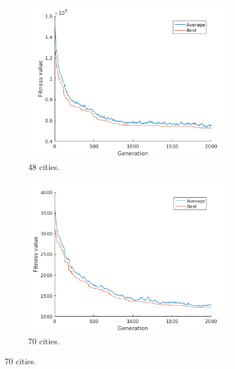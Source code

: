 \documentclass[]{article}
\begin{document}
\begin{figure}[H]
  \begin{subfigure}{0.5\textwidth}
     \centering
     \includegraphics[width=0.99\linewidth]{../GA_TSP/t148.png}
     \caption{48 cities.}
     \label{sfig:t148}
  \end{subfigure}%
  \begin{subfigure}{0.5\textwidth}
     \centering
     \includegraphics[width=0.99\linewidth]{../GA_TSP/t170.png}
     \caption{70 cities.}
     \label{sfig:t170}
  \end{subfigure}%


\end{figure}
\end{document}

